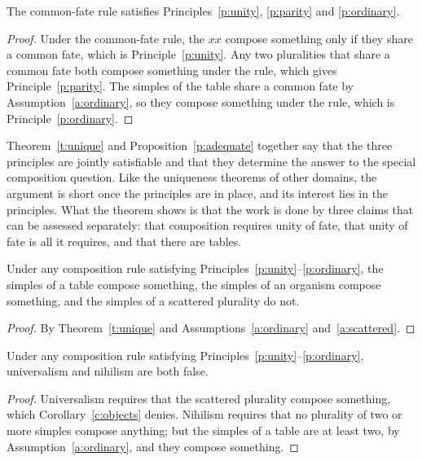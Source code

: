 \documentclass{situationist-preprint}
\begin{document}
\begin{proposition}\label{p:adequate}
The common-fate rule satisfies Principles~\ref{p:unity}, \ref{p:parity} and \ref{p:ordinary}.
\end{proposition}

\begin{proof}
Under the common-fate rule, the $xx$ compose something only if they share a common fate, which is Principle~\ref{p:unity}. Any two pluralities that share a common fate both compose something under the rule, which gives Principle~\ref{p:parity}. The simples of the table share a common fate by Assumption~\ref{a:ordinary}, so they compose something under the rule, which is Principle~\ref{p:ordinary}.
\end{proof}

Theorem~\ref{t:unique} and Proposition~\ref{p:adequate} together say that the three principles are jointly satisfiable and that they determine the answer to the special composition question. Like the uniqueness theorems of other domains, the argument is short once the principles are in place, and its interest lies in the principles. What the theorem shows is that the work is done by three claims that can be assessed separately: that composition requires unity of fate, that unity of fate is all it requires, and that there are tables.

\begin{corollary}\label{c:objects}
Under any composition rule satisfying Principles~\ref{p:unity}--\ref{p:ordinary}, the simples of a table compose something, the simples of an organism compose something, and the simples of a scattered plurality do not.
\end{corollary}

\begin{proof}
By Theorem~\ref{t:unique} and Assumptions~\ref{a:ordinary} and~\ref{a:scattered}.
\end{proof}

\begin{corollary}\label{c:extremes}
Under any composition rule satisfying Principles~\ref{p:unity}--\ref{p:ordinary}, universalism and nihilism are both false.
\end{corollary}

\begin{proof}
Universalism requires that the scattered plurality compose something, which Corollary~\ref{c:objects} denies. Nihilism requires that no plurality of two or more simples compose anything; but the simples of a table are at least two, by Assumption~\ref{a:ordinary}, and they compose something.
\end{proof}
\end{document}
